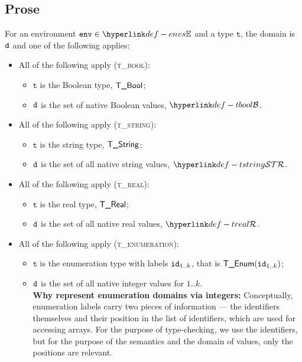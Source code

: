 \documentclass{book}
\newcommand\env[0]{\texttt{env}}
\newcommand\vt[0]{\texttt{t}}
\begin{document}
\subsection{Prose}
For an environment $\env \in \envs$ and a type $\vt$, the domain is $\texttt{d}$ and one of the following applies:
\begin{itemize}
  \item All of the following apply (\textsc{t\_bool}):
  \begin{itemize}
    \item $\vt$ is the Boolean type, $\textsf{T\_Bool}$;
    \item $\texttt{d}$ is the set of native Boolean values, $\tbool$.
  \end{itemize}

  \item All of the following apply (\textsc{t\_string}):
  \begin{itemize}
    \item $\vt$ is the string type, $\textsf{T\_String}$;
    \item $\texttt{d}$ is the set of all native string values, $\tstring$.
  \end{itemize}

  \item All of the following apply (\textsc{t\_real}):
  \begin{itemize}
    \item $\vt$ is the real type, $\textsf{T\_Real}$;
    \item $\texttt{d}$ is the set of all native real values, $\treal$.
  \end{itemize}

  \item All of the following apply (\textsc{t\_enumeration}):
  \begin{itemize}
    \item $\vt$ is the enumeration type with labels $\texttt{id}_{1..k}$, that is $\textsf{T\_Enum}(\texttt{id}_{1..k})$;
    \item $\texttt{d}$ is the set of all native integer values for $1..k$.\\
    \textbf{Why represent enumeration domains via integers:}
    Conceptually, enumeration labels carry two pieces of information --- the identifiers themselves
    and their position in the list of identifiers, which are used for accessing arrays.
    For the purpose of type-checking, we use the identifiers, but for the purpose of the semantics
    and the domain of values, only the positions are relevant.
  \end{itemize}


\end{itemize}
\end{document}
